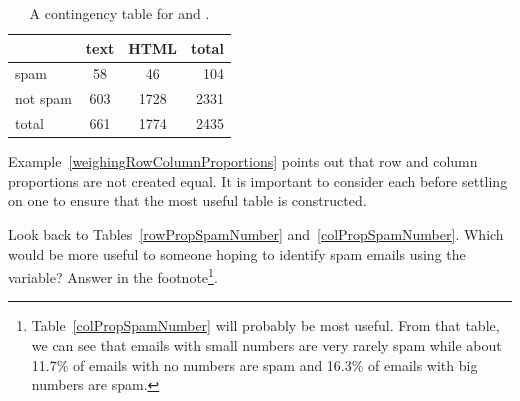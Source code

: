 \begin{table}[ht]
\centering
\begin{tabular}{l cc r}
  \hline
 & text & HTML & total \\ 
  \hline
spam & 58 & 46  & 104 \\ 
not spam & 603 & 1728  & 2331 \\ 
   \hline
total & 661 & 1774 & 2435 \\
   \hline
\end{tabular}
\caption{A contingency table for  and .}
\label{emailSpamHTMLTableTotals}
\end{table}

Example~\ref{weighingRowColumnProportions} points out that row and column proportions are not created equal. It is important to consider each before settling on one to ensure that the most useful table is constructed.

\begin{exercise}
Look back to Tables~\ref{rowPropSpamNumber} and~\ref{colPropSpamNumber}. Which would be more useful to someone hoping to identify spam emails using the  variable? Answer in the footnote\footnote{Table~\ref{colPropSpamNumber} will probably be most useful. From that table, we can see that emails with small numbers are very rarely spam while about 11.7\% of emails with no numbers are spam and 16.3\% of emails with big numbers are spam.}. %
\end{exercise}

